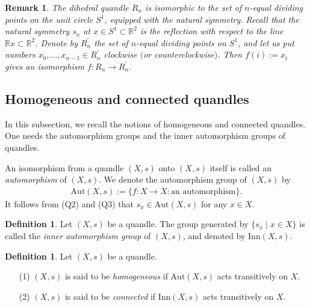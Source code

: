 \documentclass[12pt]{amsart}
\newtheorem{Rem}[Prop]{Remark}
\theoremstyle{definition}
\newtheorem{Def}[Prop]{Definition}
\begin{document}
\begin{Rem}\label{Rem2.4}
The dihedral quandle $ R_{n} $ is isomorphic to the set of $n$-equal dividing points on the unit circle $ S^{1} $, equipped with the natural symmetry. Recall that the natural symmetry $ s_{x} $ at $ x \in S^{1} \subset {{\mathbb R}}^{2} $ is the reflection with respect to the line $ {{\mathbb R}} x \subset {{\mathbb R}}^{2} $. Denote by $ R^{\prime}_{n} $ the set of $n$-equal dividing points on $ S^{1} $, and let us put numbers $ x_{0}, \ldots, x_{n-1} \in R^{\prime}_{n} $ clockwise $($or counterclockwise$)$. Then $ f(i) := x_{i} $ gives an isomorphism $ f : R_{n} \rightarrow R^{\prime}_{n} $.
\end{Rem}

\subsection{Homogeneous and connected quandles}

In this subsection, we recall the notions of homogeneous and connected quandles. One needs the automorphism groups and the inner automorphism groups of quandles.

An isomorphism from a quandle $ (X,s) $ onto $ (X,s) $ itself is called an \textit{automorphism} of $ (X,s) $. We denote the automorphism group of $ (X,s) $ by
\begin{align*}
{\mathrm{Aut}}(X,s) := \{ f : X \rightarrow X : \mbox{an automorphism} \}.
\end{align*}
It follows from (Q2) and (Q3) that $ s_{x} \in {\mathrm{Aut}}(X,s) $ for any $ x \in X $.

\begin{Def}\label{Def2.5}
Let $ (X,s) $ be a quandle. The group generated by $ \{ s_{x} \mid x \in X \} $ is called the \textit{inner automorphism group} of $ (X,s) $, and denoted by $ {\mathrm{Inn}}(X,s) $.
\end{Def}

\begin{Def}\label{Def2.6}
Let $ (X,s) $ be a quandle.
\begin{itemize}
\item[(1)]
$ (X,s) $ is said to be \textit{homogeneous} if $ {\mathrm{Aut}}(X,s) $ acts transitively on $ X $.
\item[(2)]
$ (X,s) $ is said to be \textit{connected} if $ {\mathrm{Inn}}(X,s) $ acts transitively on $ X $.
\end{itemize}
\end{Def}
\end{document}
